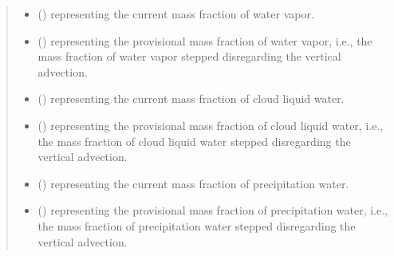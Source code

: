 \documentclass[letterpaper,10pt,english]{sphinxmanual}
\begin{document}
\begin{fulllineitems}
\begin{fulllineitems}
\begin{quote}
\begin{description}
\begin{itemize}
\item {} 
 () \textendash{}  representing the current mass fraction of water vapor.

\item {} 
 () \textendash{}  representing the provisional mass fraction of water vapor,
i.e., the mass fraction of water vapor stepped disregarding the vertical advection.

\item {} 
 () \textendash{}  representing the current mass fraction of cloud liquid water.

\item {} 
 () \textendash{}  representing the provisional mass fraction of cloud liquid water,
i.e., the mass fraction of cloud liquid water stepped disregarding the vertical advection.

\item {} 
 () \textendash{}  representing the current mass fraction of precipitation water.

\item {} 
 () \textendash{}  representing the provisional mass fraction of precipitation water,
i.e., the mass fraction of precipitation water stepped disregarding the vertical advection.

\end{itemize}

\end{description}\end{quote}

\end{fulllineitems}



\end{fulllineitems}
\end{document}
